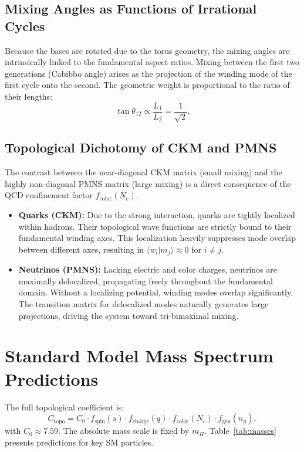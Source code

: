 \documentclass[12pt,a4paper]{article}
\begin{document}
\subsection{Mixing Angles as Functions of Irrational Cycles}
Because the bases are rotated due to the torus geometry, the mixing angles are intrinsically linked to the fundamental aspect ratios. Mixing between the first two generations (Cabibbo angle) arises as the projection of the winding mode of the first cycle onto the second. The geometric weight is proportional to the ratio of their lengths:
\begin{equation}
    \tan \theta_{12} \propto \frac{L_1}{L_2} = \frac{1}{\sqrt{2}}.
\end{equation}

\subsection{Topological Dichotomy of CKM and PMNS}
The contrast between the near-diagonal CKM matrix (small mixing) and the highly non-diagonal PMNS matrix (large mixing) is a direct consequence of the QCD confinement factor $f_{\text{color}}(N_c)$.

\begin{itemize}
    \item \textbf{Quarks (CKM):} Due to the strong interaction, quarks are tightly localized within hadrons. Their topological wave functions are strictly bound to their fundamental winding axes. This localization heavily suppresses mode overlap between different axes, resulting in $\langle w_i | m_j \rangle \approx 0$ for $i \neq j$.
    \item \textbf{Neutrinos (PMNS):} Lacking electric and color charges, neutrinos are maximally delocalized, propagating freely throughout the fundamental domain. Without a localizing potential, winding modes overlap significantly. The transition matrix for delocalized modes naturally generates large projections, driving the system toward tri-bimaximal mixing.
\end{itemize}

\section{Standard Model Mass Spectrum Predictions}
The full topological coefficient is:
\begin{equation}
    C_{\text{topo}} = C_0 \cdot f_{\text{spin}}(s) \cdot f_{\text{charge}}(q) \cdot f_{\text{color}}(N_c) \cdot f_{\text{gen}}(n_g),
\end{equation}
with $C_0 \approx 7.59$. The absolute mass scale is fixed by $m_H$. Table~\ref{tab:masses} presents predictions for key SM particles.
\end{document}
